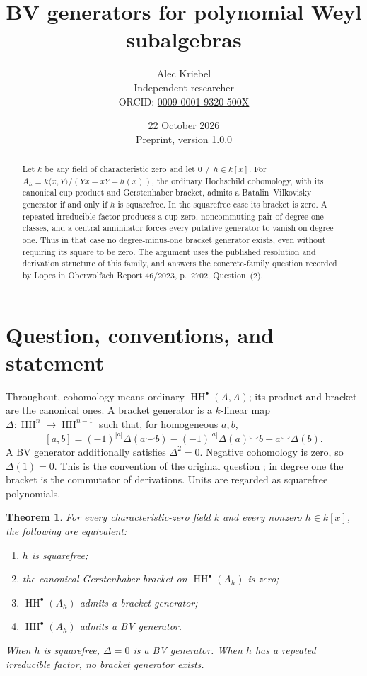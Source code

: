 \documentclass[11pt]{article}
\title{BV generators for polynomial Weyl subalgebras}
\author{Alec Kriebel\\
\small Independent researcher\\
\small ORCID: \href{https://orcid.org/0009-0001-9320-500X}{0009-0001-9320-500X}}
\date{22 October 2026\\\small Preprint, version 1.0.0}
\newtheorem{theorem}{Theorem}
\theoremstyle{remark}\newtheorem{remark}[theorem]{Remark}
\newcommand{\HH}{\operatorname{HH}}
\begin{document}
\maketitle
\begin{abstract}
Let \(k\) be any field of characteristic zero and let \(0\ne h\in k[x]\).
For \(A_h=k\langle x,Y\rangle/(Yx-xY-h(x))\), the ordinary Hochschild
cohomology, with its canonical cup product and Gerstenhaber bracket,
admits a Batalin--Vilkovisky generator if and only if \(h\) is squarefree.
In the squarefree case its bracket is zero. A repeated irreducible factor
produces a cup-zero, noncommuting pair of degree-one classes, and a central
annihilator forces every putative generator to vanish on degree one.
Thus in that case no degree-minus-one bracket generator exists, even
without requiring its square to be zero.
The argument uses the published resolution and derivation structure of this
family, and answers the concrete-family question recorded by Lopes in
Oberwolfach Report 46/2023, p.~2702, Question~(2).
\end{abstract}

\section{Question, conventions, and statement}
Throughout, cohomology means ordinary \(\HH^\bullet(A,A)\); its product and
bracket are the canonical ones. A bracket generator is a \(k\)-linear map
\(\Delta:\HH^n\to\HH^{n-1}\) such that, for homogeneous \(a,b\),
\begin{equation}\label{bv}
 [a,b]=(-1)^{|a|}\Delta(a\smile b)
       -(-1)^{|a|}\Delta(a)\smile b-a\smile\Delta(b).
\end{equation}
A BV generator additionally satisfies \(\Delta^2=0\).
Negative cohomology is zero, so \(\Delta(1)=0\). This is the convention of
the original question \cite[p.~2702]{OWR}; in degree one the bracket is the
commutator of derivations. Units are regarded as squarefree polynomials.

\begin{theorem}\label{main}
For every characteristic-zero field \(k\) and every nonzero \(h\in k[x]\),
the following are equivalent:
\begin{enumerate}
\item \(h\) is squarefree;
\item the canonical Gerstenhaber bracket on \(\HH^\bullet(A_h)\) is zero;
\item \(\HH^\bullet(A_h)\) admits a bracket generator;
\item \(\HH^\bullet(A_h)\) admits a BV generator.
\end{enumerate}
When \(h\) is squarefree, \(\Delta=0\) is a BV generator.
When \(h\) has a repeated irreducible factor, no bracket generator exists.
\end{theorem}
\end{document}
